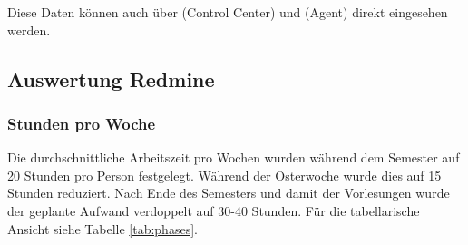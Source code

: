 Diese Daten können auch über  (Control Center) und  (Agent) direkt eingesehen werden.

\subsection*{Auswertung Redmine}

\subsubsection*{Stunden pro Woche}

Die durchschnittliche Arbeitszeit pro Wochen wurden während dem Semester auf 20 Stunden pro Person festgelegt. Während der Osterwoche wurde dies auf 15 Stunden reduziert. Nach Ende des Semesters und damit der Vorlesungen wurde der geplante Aufwand verdoppelt auf 30-40 Stunden. Für die tabellarische Ansicht siehe Tabelle \ref{tab:phases}.

\clearpage

